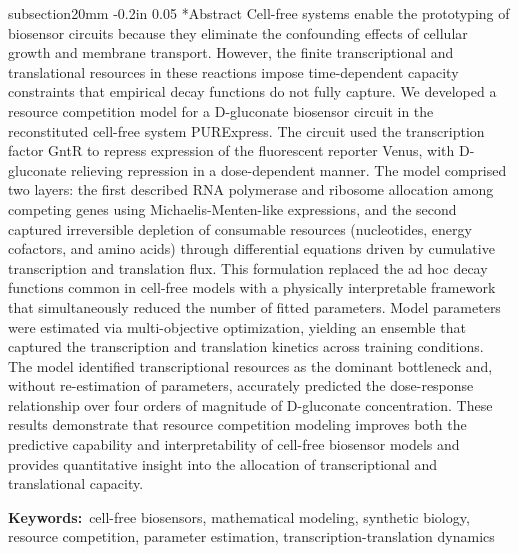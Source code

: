 \documentclass[12pt]{article}
\makeatletter
\renewcommand\section{\@startsection
	{subsection}{2}{0mm}
	{-0.2in}
	{0.05\baselineskip}
	{\normalfont\large\bfseries}}
\makeatother
\begin{document}
\section*{Abstract}
Cell-free systems enable the prototyping of biosensor circuits because they eliminate the confounding effects of cellular growth and membrane transport. However, the finite transcriptional and translational resources in these reactions impose time-dependent capacity constraints that empirical decay functions do not fully capture. We developed a resource competition model for a D-gluconate biosensor circuit in the reconstituted cell-free system PURExpress. The circuit used the transcription factor GntR to repress expression of the fluorescent reporter Venus, with D-gluconate relieving repression in a dose-dependent manner. The model comprised two layers: the first described RNA polymerase and ribosome allocation among competing genes using Michaelis-Menten-like expressions, and the second captured irreversible depletion of consumable resources (nucleotides, energy cofactors, and amino acids) through differential equations driven by cumulative transcription and translation flux. This formulation replaced the ad hoc decay functions common in cell-free models with a physically interpretable framework that simultaneously reduced the number of fitted parameters. Model parameters were estimated via multi-objective optimization, yielding an ensemble that captured the transcription and translation kinetics across training conditions. The model identified transcriptional resources as the dominant bottleneck and, without re-estimation of parameters, accurately predicted the dose-response relationship over four orders of magnitude of D-gluconate concentration. These results demonstrate that resource competition modeling improves both the predictive capability and interpretability of cell-free biosensor models and provides quantitative insight into the allocation of transcriptional and translational capacity.

\vspace{0.1in}
{\noindent \textbf{Keywords:}~cell-free biosensors, mathematical modeling, synthetic biology, resource competition, parameter estimation, transcription-translation dynamics}

\clearpage
\end{document}

